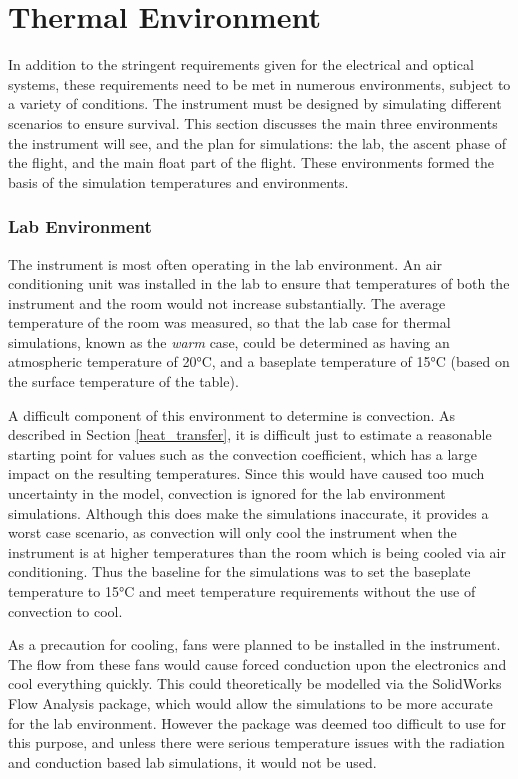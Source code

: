 \section{Thermal Environment}\label{thermal_env_ch3_sec}
In addition to the stringent requirements given for the electrical and optical systems, these requirements need to be met in numerous environments, subject to a variety of conditions. The instrument must be designed by simulating different scenarios to ensure survival. This section discusses the main three environments the instrument will see, and the plan for simulations: the lab, the ascent phase of the flight, and the main float part of the flight. These environments formed the basis of the simulation temperatures and environments. 

\subsubsection{Lab Environment}
The instrument is most often operating in the lab environment. An air conditioning unit was installed in the lab to ensure that temperatures of both the instrument and the room would not increase substantially. The average temperature of the room was measured, so that the lab case for thermal simulations, known as the \textit{warm} case, could be determined as having an atmospheric temperature of 20°C, and a baseplate temperature of 15°C (based on the surface temperature of the table).

A difficult component of this environment to determine is convection. As described in Section \ref{heat_transfer}, it is difficult just to estimate a reasonable starting point for values such as the convection coefficient, which has a large impact on the resulting temperatures. Since this would have caused too much uncertainty in the model, convection is ignored for the lab environment simulations. Although this does make the simulations inaccurate, it provides a worst case scenario, as convection will only cool the instrument when the instrument is at higher temperatures than the room which is being cooled via air conditioning. Thus the baseline for the simulations was to set the baseplate temperature to 15°C and meet temperature requirements without the use of convection to cool. 

As a precaution for cooling, fans were planned to be installed in the instrument. The flow from these fans would cause forced conduction upon the electronics and cool everything quickly. This could theoretically be modelled via the SolidWorks Flow Analysis package, which would allow the simulations to be more accurate for the lab environment. However the package was deemed too difficult to use for this purpose, and unless there were serious temperature issues with the radiation and conduction based lab simulations, it would not be used.

